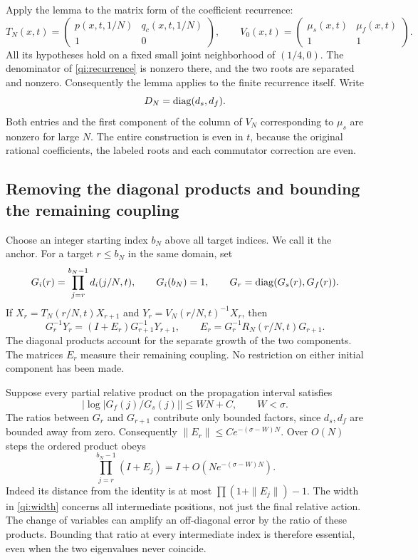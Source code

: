 Apply the lemma to the matrix form of the coefficient recurrence:
\[
 T_N(x,t)=
 \begin{pmatrix}p(x,t,1/N)&q_c(x,t,1/N)\\1&0\end{pmatrix},
 \qquad
 V_0(x,t)=
 \begin{pmatrix}\mu_s(x,t)&\mu_f(x,t)\\1&1\end{pmatrix}.
\]
All its hypotheses hold on a fixed small joint neighborhood of $(1/4,0)$.
The denominator of \eqref{qi:recurrence} is nonzero there, and the two roots are separated and nonzero. Consequently the lemma applies to the finite recurrence itself. Write
\[
 D_N=\operatorname{diag}(d_s,d_f).
\]
Both entries and the first component of the column of $V_N$
corresponding to $\mu_s$ are nonzero for large $N$. The entire construction is even in $t$, because the original rational coefficients, the labeled roots and each commutator correction are even.

\subsection{Removing the diagonal products and bounding the remaining coupling}

Choose an integer starting index $b_N$ above all target indices.
We call it the anchor. For a target $r\le b_N$ in the same domain,
set
\[
 G_i(r)=\prod_{j=r}^{b_N-1}d_i(j/N,t),\qquad
 G_i(b_N)=1,\qquad G_r=\operatorname{diag}(G_s(r),G_f(r)).
\]
If $X_r=T_N(r/N,t)X_{r+1}$ and $Y_r=V_N(r/N,t)^{-1}X_r$, then
\begin{equation}\label{qi:interaction}
 G_r^{-1}Y_r=(I+E_r)G_{r+1}^{-1}Y_{r+1},\qquad
 E_r=G_r^{-1}R_N(r/N,t)G_{r+1}.
\end{equation}
The diagonal products account for the separate growth of the two
components. The matrices $E_r$ measure their remaining coupling.
No restriction on either initial component has been made.

Suppose every partial relative product on the propagation interval satisfies
\begin{equation}\label{qi:width}
 \left|\log|G_f(j)/G_s(j)|\right|\le WN+C,\qquad W<\sigma.
\end{equation}
The ratios between $G_r$ and $G_{r+1}$ contribute only bounded factors, since $d_s,d_f$ are bounded away from zero. Consequently
$\|E_r\|\le C e^{-(\sigma-W)N}$.
Over $O(N)$ steps the ordered product obeys
\begin{equation}\label{qi:interaction-product}
 \prod_{j=r}^{b_N-1}(I+E_j)
   =I+O\!\left(N e^{-(\sigma-W)N}\right).
\end{equation}
Indeed its distance from the identity is at most
$\prod(1+\|E_j\|)-1$.
The width in \eqref{qi:width} concerns all intermediate positions, not just the final relative action. The change of variables can amplify an off-diagonal error by the
ratio of these products. Bounding that ratio at every intermediate
index is therefore essential, even when the two eigenvalues never
coincide.
